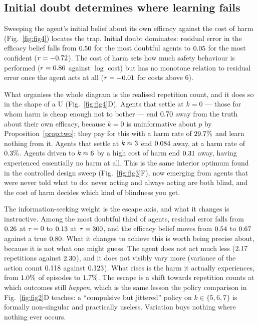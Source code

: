 \documentclass[11pt]{article}
\begin{document}
\subsection{Initial doubt determines where learning fails}

Sweeping the agent's initial belief about its own efficacy against the cost of
harm (Fig.~\ref{fig:fig4}) locates the trap. Initial doubt dominates: residual
error in the efficacy belief
falls from $0.50$ for the most doubtful agents to
$0.05$ for the most confident ($r = -0.72$). The cost of
harm sets how much safety behaviour is performed ($r = 0.86$ against
$\log$ cost) but has no monotone relation to residual error once the agent acts
at all ($r = -0.01$ for costs above $6$).

What organises the whole diagram is the realised repetition count, and it does so
in the shape of a U (Fig.~\ref{fig:fig4}D). Agents that settle at $k=0$ --- those
for whom harm is cheap enough not to bother --- end $0.70$ away from
the truth about their own efficacy, because $k=0$ is uninformative about $p$ by
Proposition~\ref{prop:two}; they pay for this with a harm rate of
$29.7\%$ and learn nothing from it. Agents that settle at
$k \approx 3$ end $0.084$ away, at a harm rate of
$0.3\%$. Agents driven to $k \approx 6$ by a high
cost of harm end $0.31$ away, having experienced essentially no harm at
all. This is the same interior optimum found in the controlled design sweep
(Fig.~\ref{fig:fig3}F), now emerging from agents that were never told what to do:
never acting and always acting are both blind, and the cost of harm decides which
kind of blindness you get.

The information-seeking weight is the escape axis, and what it changes is
instructive. Among the most doubtful third of agents, residual error falls from
$0.26$ at $\tau=0$ to $0.13$ at $\tau=300$, and the efficacy
belief moves from $0.54$ to $0.67$ against a true $0.80$.
What it changes to achieve this is worth being precise about, because it is not
what one might guess. The agent does not act much less
($2.17$ repetitions against $2.30$), and it does not visibly vary
more (variance of the action count $0.118$ against $0.123$). What
rises is the harm it actually experiences, from $1.0\%$ of episodes to
$1.7\%$. The escape is a shift towards repetition counts at which
outcomes still \emph{happen}, which is the same lesson the policy comparison in
Fig.~\ref{fig:fig2}D teaches: a ``compulsive but jittered'' policy on
$k \in \{5,6,7\}$ is formally non-singular and practically useless. Variation
buys nothing where nothing ever occurs.
\end{document}
